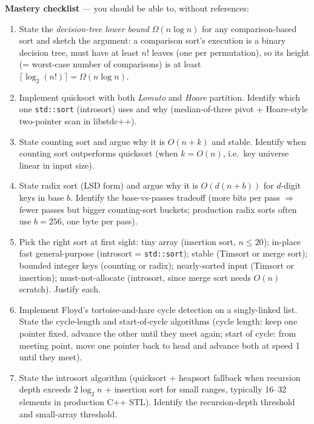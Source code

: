 \documentclass[11pt]{article}
\begin{document}
\begin{ideabox}
\textbf{Mastery checklist} --- you should be able to, without
references:
\begin{enumerate}
    \item State the \emph{decision-tree lower bound}
          $\Omega(n \log n)$ for any comparison-based sort and
          sketch the argument: a comparison sort's execution is a
          binary decision tree, must have at least $n!$ leaves
          (one per permutation), so its height (= worst-case
          number of comparisons) is at least
          $\lceil \log_2 (n!) \rceil = \Omega(n \log n)$.
    \item Implement quicksort with both \emph{Lomuto} and
          \emph{Hoare} partition. Identify which one
          \texttt{std::sort} (introsort) uses and why
          (median-of-three pivot + Hoare-style two-pointer scan in
          libstdc++).
    \item State counting sort and argue why it is $O(n + k)$ and
          stable. Identify when counting sort outperforms quicksort
          (when $k = O(n)$, i.e.\ key universe linear in input
          size).
    \item State radix sort (LSD form) and argue why it is
          $O(d(n + b))$ for $d$-digit keys in base $b$. Identify
          the base-vs-passes tradeoff (more bits per pass $\Rightarrow$
          fewer passes but bigger counting-sort buckets;
          production radix sorts often use $b = 256$, one byte
          per pass).
    \item Pick the right sort at first sight: tiny array
          (insertion sort, $n \leq 20$); in-place fast
          general-purpose (introsort = \texttt{std::sort}); stable
          (Timsort or merge sort); bounded integer keys (counting
          or radix); nearly-sorted input (Timsort or insertion);
          must-not-allocate (introsort, since merge sort needs
          $O(n)$ scratch). Justify each.
    \item Implement Floyd's tortoise-and-hare cycle detection on a
          singly-linked list. State the cycle-length and
          start-of-cycle algorithms (cycle length: keep one
          pointer fixed, advance the other until they meet again;
          start of cycle: from meeting point, move one pointer
          back to head and advance both at speed 1 until they
          meet).
    \item State the introsort algorithm (quicksort + heapsort
          fallback when recursion depth exceeds $2 \log_2 n$ +
          insertion sort for small ranges, typically
          16--32 elements in production C++ STL). Identify the
          recursion-depth threshold and small-array threshold.
\end{enumerate}


\end{ideabox}
\end{document}
